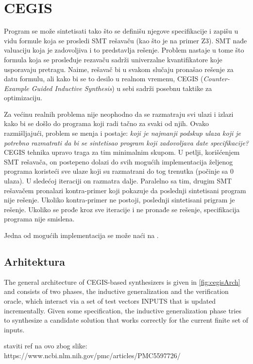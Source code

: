 \section{CEGIS}
\label{sec:cegis}

Program se može sintetisati tako što se definišu njegove specifikacije i zapišu u vidu formule koja se prosledi SMT rešavaču (kao što je na primer Z3). SMT nađe valuaciju koja je zadovoljiva i to predstavlja rešenje. Problem nastaje u tome što formula koja se prosleđuje rezavaču sadrži univerzalne kvantifikatore koje usporavaju pretragu. Naime, rešavač bi u svakom slučaju pronašao rešenje za datu formulu, ali kako bi se to desilo u realnom vremenu, CEGIS (\emph{Counter-Example Guided Inductive Synthesis}) u sebi sadrži posebnu taktike za optimizaciju.

Za većinu realnih problema nije neophodno da se razmatraju svi ulazi i izlazi kako bi se došlo do programa koji radi tačno za svaki od njih. Ovako razmišljajući, problem se menja i postaje: \emph{koji je najmanji podskup ulaza koji je potrebno razmatrati da bi se sintetisao program koji zadovoljava date specifikacije?}
CEGIS tehnika upravo traga za tim minimalnim skupom. U petlji, korišćenjem SMT rešavača, on postepeno dolazi do svih mogućih implementacija željenog programa koristeći sve ulaze koji su razmatrani do tog trenutka (počinje sa 0 ulaza). U sledećoj iteraciji on razmatra dalje. Paralelno sa tim, drugim SMT rešavačem pronalazi kontra-primer koji pokazuje da poslednji sintetisani program nije rešenje. Ukoliko kontra-primer ne postoji, poslednji sintetisani prigram je rešenje. Ukoliko se prođe kroz sve iteracije i ne pronađe se rešenje, specifikacija programa nije smislena.

Jedna od mogućih implementacija se može naći na \cite{CEGISimpl}.

\subsection{Arhitektura}
\label{subsec:Arhitektura}

The general architecture of CEGIS-based synthesizers is given in \ref{fig:cegisArch} and consists of two phases, the inductive generalization and the verification oracle, which interact via a set of test vectors INPUTS that is updated incrementally. Given some specification, the inductive generalization phase tries to synthesize a candidate solution that works correctly for the current finite set of inputs.

staviti ref na ovo zbog slike: https://www.ncbi.nlm.nih.gov/pmc/articles/PMC5597726/


